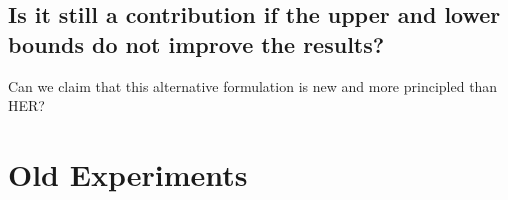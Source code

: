 \subsection{Is it still a contribution if the upper and lower bounds do not
  improve the results?}
Can we claim that this alternative formulation is new and more principled than HER?

\section{Old Experiments}
